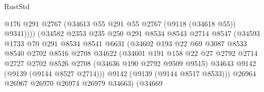 \begin{lexlean}{RustStd}
\begin{coremodule}
                                        @176
                                        @291
                                        @2767
                                        (@34613 @55 @291 @55 @2767 (@9118 (@34618 @55)) @9341))))
                                  (@34582
                                    @2353
                                    @235
                                    @250
                                    @291
                                    @8534
                                    @8543
                                    @2714
                                    @8547
                                    (@34593
                                      @1733
                                      @70
                                      @291
                                      @8534
                                      @8541
                                      @6631
                                      (@34602
                                        @193
                                        @22
                                        @69
                                        @3087
                                        @8533
                                        @8540
                                        @2702
                                        @8516
                                        @2708
                                        @34622
                                        (@34601
                                          @191
                                          @158
                                          @22
                                          @27
                                          @2792
                                          @2714
                                          @2727
                                          @2702
                                          @8526
                                          @2708
                                          (@34636 @190 @2792 @9509 @9515)
                                          @34643
                                          @9142
                                          (@9139 (@9144 @8527 @2714)))
                                        @9142
                                        (@9139 (@9144 @8517 @8533)))
                                      @26964
                                      @26967
                                      @26970
                                      @26974
                                      @26979
                                      @34663)
                                    (@34669

\end{coremodule}
\end{lexlean}
